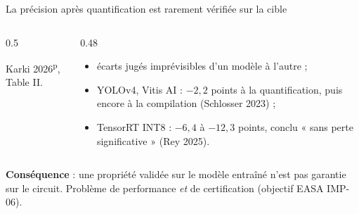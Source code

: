 \documentclass[aspectratio=169,11pt]{beamer}
\newcommand{\pre}{\textsuperscript{\color{acc}p}}
\begin{document}
{\shorthandoff{;}
\begin{frame}{La précision après quantification est rarement vérifiée sur la cible}
  \begin{columns}[c]
    \begin{column}{0.5\textwidth}

      {\tiny\color{gray} Karki 2026\pre, Table II.}
    \end{column}
    \begin{column}{0.48\textwidth}
      \small
      \begin{itemize}
        \item écarts jugés \alert{imprévisibles} d'un modèle à l'autre ;
        \item YOLOv4, Vitis AI : $-2{,}2$ points à la quantification, puis encore à la
              compilation (Schlosser 2023) ;
        \item TensorRT INT8 : $-6{,}4$ à $-12{,}3$ points, conclu « sans perte significative »
              (Rey 2025).
      \end{itemize}
    \end{column}
  \end{columns}

  \vspace{0.4em}
  \textbf{Conséquence} : une propriété validée sur le modèle entraîné n'est pas garantie sur
  le circuit. Problème de performance \emph{et} de certification (objectif EASA IMP-06).
\end{frame}}
\end{document}
